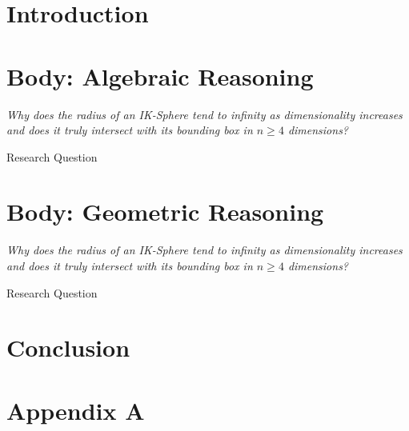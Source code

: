 \documentclass[a4paper, 12pt]{report}
\theoremstyle{definition}
\begin{document}
    
    
    
    \doublespacing
    
    
    \chapter{Introduction}
    
    
    \chapter{Body: Algebraic Reasoning}
    \epigraph{\textit{Why  does  the  radius  of  an  IK-Sphere  tend  to  infinity  as  dimensionality increases and does it truly intersect with its bounding box in $n \geq 4$ dimensions?}}{Research Question}
    
    
    \chapter{Body: Geometric Reasoning}
    \epigraph{\textit{Why  does  the  radius  of  an  IK-Sphere  tend  to  infinity  as  dimensionality increases and does it truly intersect with its bounding box in $n \geq 4$ dimensions?}}{Research Question}
    
    
    \chapter{Conclusion}
    
    
    \printbibliography
    
    \appendix
    \chapter{Appendix A}
    
\end{document}
